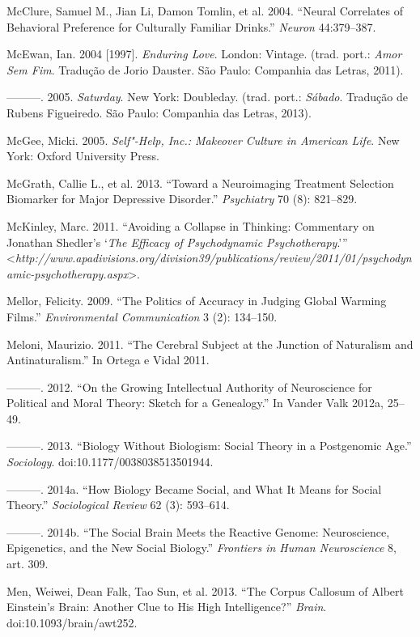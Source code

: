 McClure, Samuel M., Jian Li, Damon Tomlin, et al. 2004. ``Neural
Correlates of Behavioral Preference for Culturally Familiar Drinks.''
\emph{Neuron} 44:379--387.

McEwan, Ian. 2004 {[}1997{]}. \emph{Enduring Love}. London: Vintage.
(trad. port.: \emph{Amor Sem Fim}. Tradução de Jorio Dauster. São Paulo:
Companhia das Letras, 2011).

---------. 2005. \emph{Saturday}. New York: Doubleday. (trad. port.:
\emph{Sábado}. Tradução de Rubens Figueiredo. São Paulo: Companhia das
Letras, 2013).

McGee, Micki. 2005. \emph{Self"-Help, Inc.: Makeover Culture in American
Life}. New York: Oxford University Press.

McGrath, Callie L., et al. 2013. ``Toward a Neuroimaging Treatment
Selection Biomarker for Major Depressive Disorder.'' \emph{
Psychiatry} 70 (8): 821--829.

McKinley, Marc. 2011. ``Avoiding a Collapse in Thinking: Commentary on
Jonathan Shedler's `\emph{The Efficacy of Psychodynamic
Psychotherapy}.'''
\textless{}\emph{http://www.apadivisions.org/division39/publications/review/2011/01/psychodynamic-psychotherapy.aspx}\textgreater{}.

Mellor, Felicity. 2009. ``The Politics of Accuracy in Judging Global
Warming Films.'' \emph{Environmental Communication} 3 (2): 134--150.

Meloni, Maurizio. 2011. ``The Cerebral Subject at the Junction of
Naturalism and Antinaturalism.'' In Ortega e Vidal 2011.

---------. 2012. ``On the Growing Intellectual Authority of Neuroscience
for Political and Moral Theory: Sketch for a Genealogy.'' In Vander Valk
2012a, 25--49.

---------. 2013. ``Biology Without Biologism: Social Theory in a
Postgenomic Age.'' \emph{Sociology}. doi:10.1177/0038038513501944.

---------. 2014a. ``How Biology Became Social, and What It Means for
Social Theory.'' \emph{Sociological Review} 62 (3): 593--614.

---------. 2014b. ``The Social Brain Meets the Reactive Genome:
Neuroscience, Epigenetics, and the New Social Biology.'' \emph{Frontiers
in Human Neuroscience} 8, art. 309.

Men, Weiwei, Dean Falk, Tao Sun, et al. 2013. ``The Corpus Callosum of
Albert Einstein's Brain: Another Clue to His High Intelligence?''
\emph{Brain}. doi:10.1093/brain/awt252.


